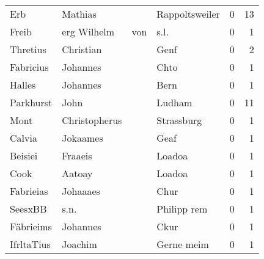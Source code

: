 \begin{center}
\begin{tiny}
\begin{longtabu}{llllrr}
                      Erb &                            Mathias &             &                              Rappoltsweiler &          0 &        13 \\
                    Freib &                        erg Wilhelm &         von &                                        s.l. &          0 &         1 \\
                 Thretius &                          Christian &             &                                        Genf &          0 &         2 \\
                Fabricius &                           Johannes &             &                                        Chto &          0 &         1 \\
                   Halles &                           Johannes &             &                                        Bern &          0 &         1 \\
                Parkhurst &                               John &             &                                      Ludham &          0 &        11 \\
                     Mont &                      Christopherus &             &                                  Strassburg &          0 &         1 \\
                   Calvia &                           Jokaames &             &                                        Geaf &          0 &         1 \\
                  Beisiei &                            Fraaeis &             &                                      Loadoa &          0 &         1 \\
                     Cook &                             Aatoay &             &                                      Loadoa &          0 &         1 \\
                Fabrieias &                           Johaaaes &             &                                        Chur &          0 &         1 \\
                  SeesxBB &                               s.n. &             &                                 Philipp rem &          0 &         1 \\
                Fäbrieims &                           Johannes &             &                                        Ckur &          0 &         1 \\
               IfrltaTius &                            Joachim &             &                                  Gerne meim &          0 &         1 \\

\end{longtabu}
\end{tiny}
\end{center}
